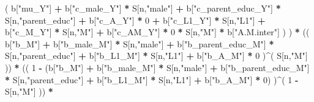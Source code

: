 \documentclass[
]{book}
\newenvironment{Shaded}{\begin{snugshade}}{\end{snugshade}}
\newcommand{\DecValTok}[1]{\textcolor[rgb]{0.00,0.00,0.81}{#1}}
\newcommand{\NormalTok}[1]{#1}
\newcommand{\SpecialCharTok}[1]{\textcolor[rgb]{0.81,0.36,0.00}{\textbf{#1}}}
\newcommand{\StringTok}[1]{\textcolor[rgb]{0.31,0.60,0.02}{#1}}
\begin{document}
\begin{Shaded}
\begin{Highlighting}[]
\NormalTok{                          ( b[}\StringTok{"mu\_Y"}\NormalTok{] }\SpecialCharTok{+} 
\NormalTok{                              b[}\StringTok{"c\_male\_Y"}\NormalTok{] }\SpecialCharTok{*}\NormalTok{ S[n,}\StringTok{"male"}\NormalTok{] }\SpecialCharTok{+} 
\NormalTok{                              b[}\StringTok{"c\_parent\_educ\_Y"}\NormalTok{] }\SpecialCharTok{*}\NormalTok{ S[n,}\StringTok{"parent\_educ"}\NormalTok{] }\SpecialCharTok{+} 
\NormalTok{                              b[}\StringTok{"c\_A\_Y"}\NormalTok{] }\SpecialCharTok{*} \DecValTok{0} \SpecialCharTok{+} 
\NormalTok{                              b[}\StringTok{"c\_L1\_Y"}\NormalTok{] }\SpecialCharTok{*}\NormalTok{ S[n,}\StringTok{"L1"}\NormalTok{] }\SpecialCharTok{+}
\NormalTok{                              b[}\StringTok{"c\_M\_Y"}\NormalTok{] }\SpecialCharTok{*}\NormalTok{ S[n,}\StringTok{"M"}\NormalTok{] }\SpecialCharTok{+} 
\NormalTok{                              b[}\StringTok{"c\_AM\_Y"}\NormalTok{] }\SpecialCharTok{*} \DecValTok{0} \SpecialCharTok{*}\NormalTok{ S[n,}\StringTok{"M"}\NormalTok{] }\SpecialCharTok{*}\NormalTok{ b[}\StringTok{"A.M.inter"}\NormalTok{] ) ) }\SpecialCharTok{*}
\NormalTok{      (( b[}\StringTok{"b\_M"}\NormalTok{] }\SpecialCharTok{+} 
\NormalTok{           b[}\StringTok{"b\_male\_M"}\NormalTok{] }\SpecialCharTok{*}\NormalTok{ S[n,}\StringTok{"male"}\NormalTok{] }\SpecialCharTok{+} 
\NormalTok{           b[}\StringTok{"b\_parent\_educ\_M"}\NormalTok{] }\SpecialCharTok{*}\NormalTok{ S[n,}\StringTok{"parent\_educ"}\NormalTok{] }\SpecialCharTok{+} 
\NormalTok{           b[}\StringTok{"b\_L1\_M"}\NormalTok{] }\SpecialCharTok{*}\NormalTok{ S[n,}\StringTok{"L1"}\NormalTok{] }\SpecialCharTok{+}
\NormalTok{           b[}\StringTok{"b\_A\_M"}\NormalTok{] }\SpecialCharTok{*} \DecValTok{0}\NormalTok{ )}\SpecialCharTok{\^{}}\NormalTok{( S[n,}\StringTok{"M"}\NormalTok{] )) }\SpecialCharTok{*} 
\NormalTok{      (( }\DecValTok{1} \SpecialCharTok{{-}}\NormalTok{ (b[}\StringTok{"b\_M"}\NormalTok{] }\SpecialCharTok{+} 
\NormalTok{                b[}\StringTok{"b\_male\_M"}\NormalTok{] }\SpecialCharTok{*}\NormalTok{ S[n,}\StringTok{"male"}\NormalTok{] }\SpecialCharTok{+} 
\NormalTok{                b[}\StringTok{"b\_parent\_educ\_M"}\NormalTok{] }\SpecialCharTok{*}\NormalTok{ S[n,}\StringTok{"parent\_educ"}\NormalTok{] }\SpecialCharTok{+} 
\NormalTok{                b[}\StringTok{"b\_L1\_M"}\NormalTok{] }\SpecialCharTok{*}\NormalTok{ S[n,}\StringTok{"L1"}\NormalTok{] }\SpecialCharTok{+}
\NormalTok{                b[}\StringTok{"b\_A\_M"}\NormalTok{] }\SpecialCharTok{*} \DecValTok{0}\NormalTok{) )}\SpecialCharTok{\^{}}\NormalTok{( }\DecValTok{1} \SpecialCharTok{{-}}\NormalTok{ S[n,}\StringTok{"M"}\NormalTok{] ))  }\SpecialCharTok{*}

\end{Highlighting}
\end{Shaded}
\end{document}
